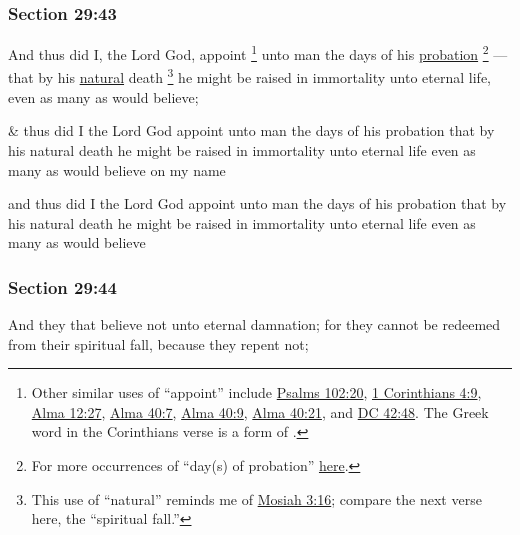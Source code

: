 	\subsubsection{Section 29:43} %
		\label{DC29-43}

		And thus did I, the Lord God, appoint%
			\footnote{%
				Other similar uses of ``appoint'' include \hyperref[PSALMS-102-20]{Psalms 102:20}, \hyperref[1CORINTHIANS-4-9]{1 Corinthians 4:9}, \hyperref[ALMA-12-27]{Alma 12:27}, \hyperref[ALMA-40-7]{Alma 40:7}, \hyperref[ALMA-40-9]{Alma 40:9}, \hyperref[ALMA-40-21]{Alma 40:21}, and \hyperref[DC42-48]{DC 42:48}. The Greek word in the Corinthians verse is a form of .
				}
		unto man the days of his \hyperref[PROBATION]{probation}%
			\footnote{%
				For more occurrences of ``day(s) of probation'' \hyperref[PROBATION-PHRASES]{here}.
				}%
		---that by his \hyperref[NATURAL]{natural} death%
			\footnote{%
				This use of ``natural'' reminds me of \hyperref[MOSIAH-3-16]{Mosiah 3:16}; compare the next verse here, the ``spiritual fall.''
				}
		he might be raised in immortality unto eternal life, even as many as would believe;

		\begin{framed}
		\scriptsize
			\begin{compactdesc}
				\item[JSP] \& thus did I the Lord God appoint unto man the days of his probation that by his natural death he might be raised in immortality unto eternal life even as many as would believe on my name
				\item[HSN] and thus did I the Lord God appoint unto man the days of his probation that by his natural death he might be raised in immortality unto eternal life even as many as would believe
			\end{compactdesc}
		\end{framed}

	\subsubsection{Section 29:44} %
		\label{DC29-44}

		And they that believe not unto eternal damnation; for they cannot be redeemed from their spiritual fall, because they repent not;

